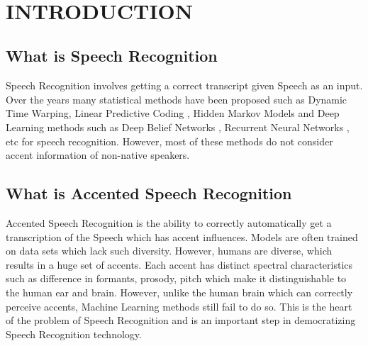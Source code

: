 \documentclass[letterpaper,12pt]{article}
\begin{document}
\begin{abstract}
\end{abstract}

\pagebreak 

\tableofcontents
\pagebreak
\listoftables
\pagebreak
\listoffigures
\pagebreak



\

\section{INTRODUCTION} \label{intro}
\subsection{What is Speech Recognition}
Speech Recognition involves getting a correct transcript given Speech as an input.
Over the years many statistical methods have been proposed such as Dynamic Time Warping\cite{Permanasari_2019}, 
Linear Predictive Coding \cite{LPC}, Hidden Markov Models \cite{18626} and Deep Learning methods such as 
Deep Belief Networks \cite{huang2014research}, Recurrent Neural Networks \cite{huang2014research}, etc for speech
recognition. However, most of these methods do not consider accent information of
non-native speakers.
\\
\subsection{What is Accented Speech Recognition}
Accented Speech Recognition is the ability to correctly automatically get a transcription of the 
Speech which has accent influences. Models are often trained on data sets which lack such 
diversity. However, humans are diverse, which results in a huge set of accents. Each accent 
has distinct spectral characteristics such as difference in formants, prosody, pitch which make 
it distinguishable to the human ear and brain. However, unlike the human brain which can
correctly perceive accents, Machine Learning methods still fail to do so. This is the heart of 
the problem of Speech Recognition and is an important step in democratizing Speech 
Recognition technology. 
\
\end{document}
